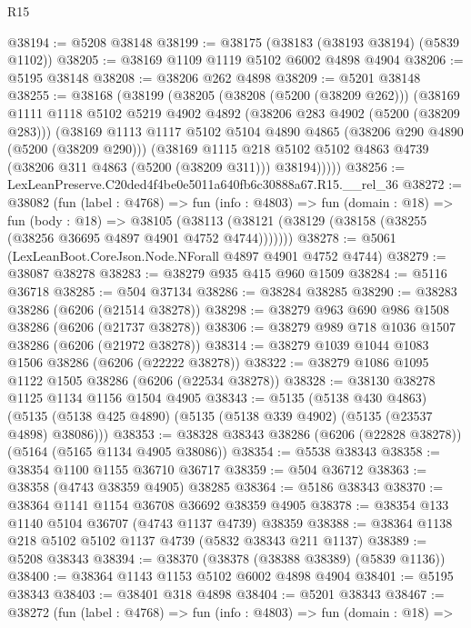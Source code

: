 \begin{lexlean}{R15}
\begin{coremodule}
{{{{{{{{{{{@38194 := @5208 @38148
@38199 := @38175 (@38183 (@38193 @38194) (@5839 @1102))
@38205 := @38169 @1109 @1119 @5102 @6002 @4898 @4904
@38206 := @5195 @38148
@38208 := @38206 @262 @4898
@38209 := @5201 @38148
@38255 := @38168
    (@38199
      (@38205
        (@38208 (@5200 (@38209 @262)))
        (@38169
          @1111
          @1118
          @5102
          @5219
          @4902
          @4892
          (@38206 @283 @4902 (@5200 (@38209 @283)))
          (@38169
            @1113
            @1117
            @5102
            @5104
            @4890
            @4865
            (@38206 @290 @4890 (@5200 (@38209 @290)))
            (@38169
              @1115
              @218
              @5102
              @5102
              @4863
              @4739
              (@38206 @311 @4863 (@5200 (@38209 @311)))
              @38194)))))
@38256 := LexLeanPreserve.C20ded4f4be0e5011a640fb6c30888a67.R15.__rel_36
@38272 := @38082
    (fun (label : @4768) =>
    fun (info : @4803) =>
    fun (domain : @18) =>
    fun (body : @18) =>
    @38105 (@38113 (@38121 (@38129 (@38158 (@38255 (@38256 @36695 @4897 @4901 @4752 @4744)))))))
@38278 := @5061 (LexLeanBoot.CoreJson.Node.NForall @4897 @4901 @4752 @4744)
@38279 := @38087 @38278
@38283 := @38279 @935 @415 @960 @1509
@38284 := @5116 @36718
@38285 := @504 @37134
@38286 := @38284 @38285
@38290 := @38283 @38286 (@6206 (@21514 @38278))
@38298 := @38279 @963 @690 @986 @1508 @38286 (@6206 (@21737 @38278))
@38306 := @38279 @989 @718 @1036 @1507 @38286 (@6206 (@21972 @38278))
@38314 := @38279 @1039 @1044 @1083 @1506 @38286 (@6206 (@22222 @38278))
@38322 := @38279 @1086 @1095 @1122 @1505 @38286 (@6206 (@22534 @38278))
@38328 := @38130 @38278 @1125 @1134 @1156 @1504 @4905
@38343 := @5135
    (@5138 @430 @4863)
    (@5135 (@5138 @425 @4890) (@5135 (@5138 @339 @4902) (@5135 (@23537 @4898) @38086)))
@38353 := @38328 @38343 @38286 (@6206 (@22828 @38278)) (@5164 (@5165 @1134 @4905 @38086))
@38354 := @5538 @38343
@38358 := @38354 @1100 @1155 @36710 @36717
@38359 := @504 @36712
@38363 := @38358 (@4743 @38359 @4905) @38285
@38364 := @5186 @38343
@38370 := @38364 @1141 @1154 @36708 @36692 @38359 @4905
@38378 := @38354 @133 @1140 @5104 @36707 (@4743 @1137 @4739) @38359
@38388 := @38364 @1138 @218 @5102 @5102 @1137 @4739 (@5832 @38343 @211 @1137)
@38389 := @5208 @38343
@38394 := @38370 (@38378 (@38388 @38389) (@5839 @1136))
@38400 := @38364 @1143 @1153 @5102 @6002 @4898 @4904
@38401 := @5195 @38343
@38403 := @38401 @318 @4898
@38404 := @5201 @38343
@38467 := @38272
    (fun (label : @4768) =>
    fun (info : @4803) =>
    fun (domain : @18) =>
}}}}}}}}}}}
\end{coremodule}
\end{lexlean}

